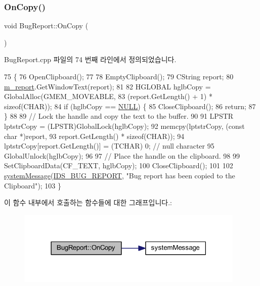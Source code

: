 \subsubsection{\texorpdfstring{On\+Copy()}{OnCopy()}}
{\footnotesize\ttfamily void Bug\+Report\+::\+On\+Copy (\begin{DoxyParamCaption}{ }\end{DoxyParamCaption})\hspace{0.3cm}{\ttfamily [protected]}}



Bug\+Report.\+cpp 파일의 74 번째 라인에서 정의되었습니다.


\begin{DoxyCode}
75 \{
76   OpenClipboard();
77 
78   EmptyClipboard();
79   CString report;
80   \mbox{\hyperlink{class_bug_report_aef6dd887fcfe40d98d0fa1c6cf2d2466}{m\_report}}.GetWindowText(report);
81 
82   HGLOBAL hglbCopy = GlobalAlloc(GMEM\_MOVEABLE, 
83                                  (report.GetLength() + 1) * \textcolor{keyword}{sizeof}(CHAR)); 
84   \textcolor{keywordflow}{if} (hglbCopy == \mbox{\hyperlink{getopt1_8c_a070d2ce7b6bb7e5c05602aa8c308d0c4}{NULL}}) \{ 
85     CloseClipboard(); 
86     \textcolor{keywordflow}{return};
87   \} 
88  
89   \textcolor{comment}{// Lock the handle and copy the text to the buffer. }
90  
91   LPSTR lptstrCopy = (LPSTR)GlobalLock(hglbCopy); 
92   memcpy(lptstrCopy, (\textcolor{keyword}{const} \textcolor{keywordtype}{char} *)report, 
93          report.GetLength() * \textcolor{keyword}{sizeof}(CHAR)); 
94   lptstrCopy[report.GetLength()] = (TCHAR) 0;    \textcolor{comment}{// null character }
95   GlobalUnlock(hglbCopy); 
96  
97   \textcolor{comment}{// Place the handle on the clipboard. }
98   
99   SetClipboardData(CF\_TEXT, hglbCopy);   
100   CloseClipboard();
101 
102   \mbox{\hyperlink{system_8cpp_a747a9cb8e015a3d45cca636b5bd0fc69}{systemMessage}}(\mbox{\hyperlink{resource_8h_aba09749704e101c4a9d2b4fc7353b802}{IDS\_BUG\_REPORT}}, \textcolor{stringliteral}{"Bug report has been copied to the Clipboard"});
103 \}
\end{DoxyCode}
이 함수 내부에서 호출하는 함수들에 대한 그래프입니다.\+:
\nopagebreak
\begin{figure}[H]
\begin{center}
\leavevmode
\includegraphics[width=309pt]{class_bug_report_a6b74689c7cf7ed6daeaaf2dc8f1498ab_cgraph}
\end{center}
\end{figure}
\mbox{\label{class_bug_report_abcfc2e192747272d1708a1d479bfd45b}} 
